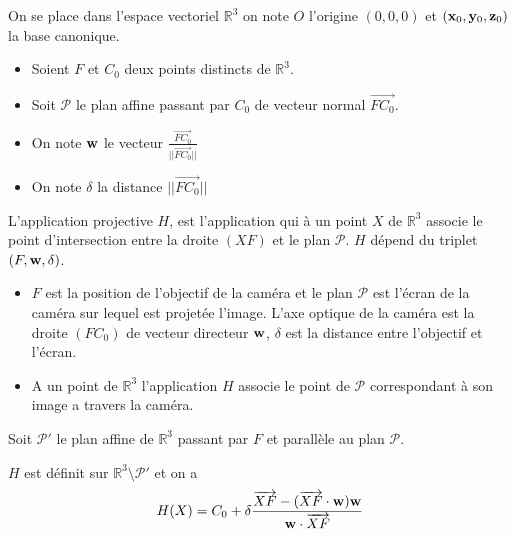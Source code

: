 On se place dans l'espace vectoriel $\mathbb{R}^{3}$ on note $O$ l'origine $(0,0,0)$ et $(\mathbf{x}_0,\mathbf{y}_0,\mathbf{z}_0)$ la base canonique.
\begin{itemize}
\item Soient $F$ et $C_0$ deux points distincts de  $\mathbb{R}^{3}$.
\item Soit $\mathcal{P}$ le plan affine passant par $C_0$ de vecteur normal $\overrightarrow{FC_0}$.
\item On note $\mathbf{w}$ le vecteur $\frac{\overrightarrow{FC_0}}{|| \overrightarrow{FC_0}||}$
\item On note $\delta$ la distance  $|| \overrightarrow{FC_0}||$
\end{itemize}
\begin{Def}
L'application projective $H$, est l'application qui à un point $X$ de $\mathbb{R}^{3}$ associe le point d'intersection entre la droite $(XF)$ et le plan $\mathcal{P}$. $H$ dépend du triplet $(F,\mathbf{w},\delta)$.
\end{Def}
\begin{remarques}
\begin{itemize}
\item $F$ est la position de l'objectif de la caméra et le plan $\mathcal{P}$ est l'écran de la caméra sur lequel est projetée l'image. L'axe optique de la caméra est la droite $(FC_0)$ de vecteur directeur $\mathbf{w}$, $\delta$ est la distance entre l'objectif et l'écran.
\item A un point de $\mathbb{R}^3$  l'application $H$ associe le  point de $\mathcal{P}$ correspondant à son image a travers la caméra.
\end{itemize}
\end{remarques}
Soit $\mathcal{P}'$ le plan affine de $\mathbb{R}^{3}$ passant par $F$ et parallèle au plan $\mathcal{P}$.
\begin{lem}
$H$ est définit sur $\mathbb{R}^3 \setminus \mathcal{P}'$ et on a  
\begin{equation}
H(X) = C_0 +  \delta \frac{\overrightarrow{XF}-(\overrightarrow{XF}\cdot \mathbf{w} )\mathbf{w}}{\mathbf{w} \cdot \overrightarrow{XF}} 
\label{formul_lem_app_proj}
\end{equation}
\label{lem_app_proj}
\end{lem}
